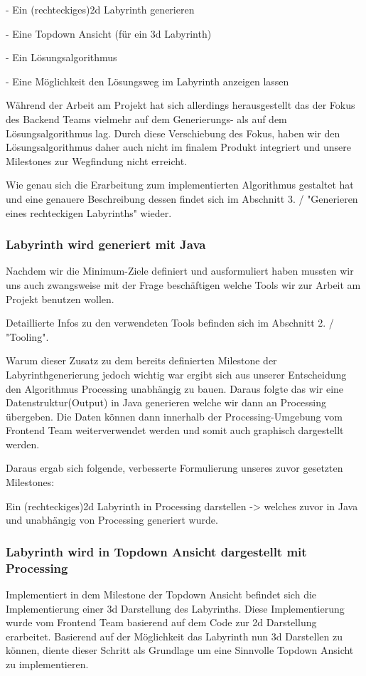 	- Ein (rechteckiges)2d Labyrinth generieren
	
	- Eine Topdown Ansicht (für ein 3d Labyrinth)
		
	- Ein Lösungsalgorithmus
	
	- Eine Möglichkeit den Lösungsweg im Labyrinth anzeigen lassen
		
	Während der Arbeit am Projekt hat sich allerdings herausgestellt das der Fokus des Backend Teams vielmehr auf dem Generierungs- als auf dem Lösungsalgorithmus lag. Durch diese Verschiebung des Fokus, haben wir den Lösungsalgorithmus daher auch nicht im finalem Produkt integriert und unsere Milestones zur Wegfindung nicht erreicht.
	
	Wie genau sich die Erarbeitung zum implementierten Algorithmus gestaltet hat und eine genauere Beschreibung dessen findet sich im Abschnitt 3. / "Generieren eines rechteckigen Labyrinths" wieder.

    \subsubsection*{Labyrinth wird generiert mit Java}
		Nachdem wir die Minimum-Ziele definiert und ausformuliert haben mussten wir uns auch zwangsweise mit der Frage beschäftigen welche Tools wir zur Arbeit am Projekt benutzen wollen.
		
		Detaillierte Infos zu den verwendeten Tools befinden sich im Abschnitt 2. / "Tooling".
		
		Warum dieser Zusatz zu dem bereits definierten Milestone der Labyrinthgenerierung jedoch wichtig war ergibt sich aus unserer Entscheidung den Algorithmus Processing unabhängig zu bauen. Daraus folgte das wir eine Datenstruktur(Output) in Java generieren welche wir dann an Processing übergeben. Die Daten können dann innerhalb der Processing-Umgebung vom Frontend Team weiterverwendet werden und somit auch graphisch dargestellt werden.
		  
		Daraus ergab sich folgende, verbesserte Formulierung unseres zuvor gesetzten Milestones:    
		
		Ein (rechteckiges)2d Labyrinth in Processing darstellen -> welches zuvor in Java und unabhängig von Processing generiert wurde.
		
    \subsubsection*{Labyrinth wird in Topdown Ansicht dargestellt mit Processing}
    	Implementiert in dem Milestone der Topdown Ansicht befindet sich die Implementierung einer 3d Darstellung des Labyrinths. Diese Implementierung wurde vom Frontend Team basierend auf dem Code zur 2d Darstellung erarbeitet. Basierend auf der Möglichkeit das Labyrinth nun 3d Darstellen zu können, diente dieser Schritt als Grundlage um eine Sinnvolle Topdown Ansicht zu implementieren.
    	

